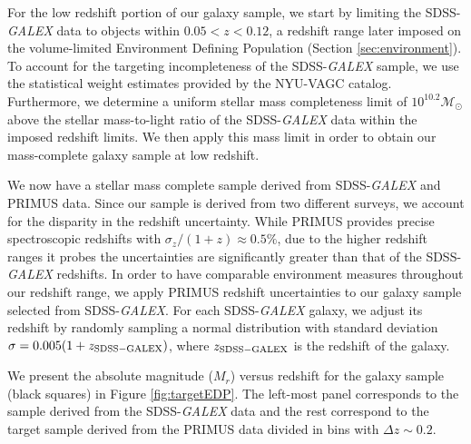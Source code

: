 \documentclass{emulateapj}
\begin{document}
For the low redshift portion of our galaxy sample, we start by limiting the SDSS-{\em GALEX} data to objects within $0.05 < z < 0.12$, a redshift range later imposed on the volume-limited Environment Defining Population (Section \ref{sec:environment}). To account for the targeting incompleteness of the SDSS-{\em GALEX} sample, we use the statistical weight estimates provided by the NYU-VAGC catalog. Furthermore, we determine a uniform stellar mass completeness limit of $10^{10.2} \mathcal{M}_{\odot}$ above the stellar mass-to-light ratio of the SDSS-{\em GALEX} data within the imposed redshift limits. We then apply this mass limit in order to obtain our mass-complete galaxy sample at low redshift. 

We now have a stellar mass complete sample derived from SDSS-{\em GALEX} and PRIMUS data. Since our sample is derived from two different surveys, we account for the disparity in the redshift uncertainty. While PRIMUS provides precise spectroscopic redshifts with $\sigma_{z}/(1+z) \approx 0.5 \%$, due to the higher redshift ranges it probes the uncertainties are significantly greater than that of the SDSS-{\em GALEX} redshifts. In order to have comparable environment measures throughout our redshift range, we apply PRIMUS redshift uncertainties to our galaxy sample selected from SDSS-{\em GALEX}. For each SDSS-{\em GALEX} galaxy, we adjust its redshift by randomly sampling a normal distribution with standard deviation $\sigma = 0.005 (1+z_{\rm{SDSS}-GALEX})$, where $z_{\rm{SDSS}-GALEX}$ is the redshift of the galaxy. 

We present the absolute magnitude ($M_{r}$) versus redshift for the galaxy sample (black squares) in Figure \ref{fig:targetEDP}. The left-most panel corresponds to the sample derived from the SDSS-{\em GALEX} data and the rest correspond to the target sample derived from the PRIMUS data divided in bins with $\Delta z \sim 0.2$. 
\end{document}
